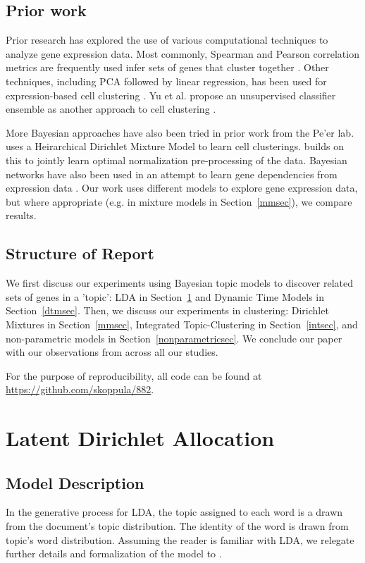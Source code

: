 \documentclass{article}
\begin{document}
\subsection{Prior work}
Prior research has explored the use of various computational techniques to analyze gene expression data. Most commonly, Spearman and Pearson correlation metrics are frequently used infer sets of genes that cluster together \cite{profiling, nature}. Other techniques, including PCA followed by linear regression, has been used for expression-based cell clustering \cite{transcriptomics}. Yu et al. propose an unsupervised classifier ensemble as another approach to cell clustering \cite{consensus}. 

More Bayesian approaches have also been tried in prior work from the Pe'er lab. \cite{bayesge2} uses a Heirarchical Dirichlet Mixture Model to learn cell clusterings. \cite{bayesge1} builds on this to jointly learn optimal normalization pre-processing of the data. Bayesian networks have also been used in an attempt to learn gene dependencies from expression data \cite{bayesge3}. Our work uses different models to explore gene expression data, but where appropriate (e.g. in mixture models in Section~\ref{mmsec}), we compare results.

\subsection{Structure of Report}
We first discuss our experiments using Bayesian topic models to discover related sets of genes in a 'topic': LDA in Section~\ref{ldasec} and Dynamic Time Models in Section~\ref{dtmsec}. Then, we discuss our experiments in clustering: Dirichlet Mixtures in Section~\ref{mmsec}, Integrated Topic-Clustering in Section~\ref{intsec}, and non-parametric models in Section~\ref{nonparametricsec}. We conclude our paper with our observations from across all our studies. 

For the purpose of reproducibility, all code can be found at \url{https://github.com/skoppula/882}.

\section{Latent Dirichlet Allocation} 
\label{ldasec}
\subsection{Model Description} 
In the generative process for LDA, the topic assigned to each word is a drawn from the document's topic distribution. The identity of the word is drawn from topic's word distribution. Assuming the reader is familiar with LDA, we relegate further details and formalization of the model to \cite{LDA}.
\end{document}
